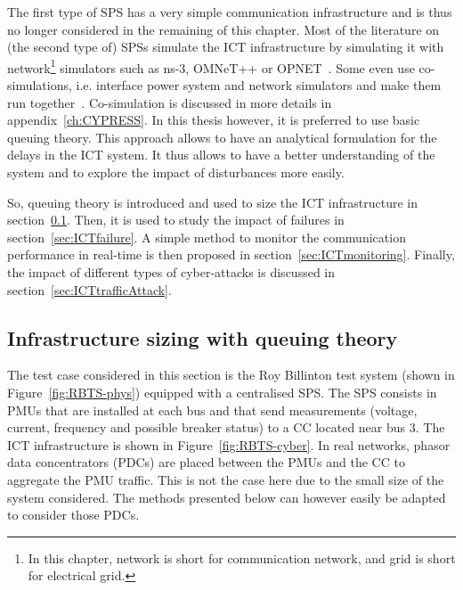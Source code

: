 The first type of SPS has a very simple communication infrastructure and is thus no longer considered in the remaining of this chapter. Most of the literature on (the second type of) SPSs simulate the ICT infrastructure by simulating it with network\footnote{In this chapter, network is short for communication network, and grid is short for electrical grid.} simulators such as ns-3, OMNeT++ or OPNET~\cite{SPS-Ciapessoni}. Some even use co-simulations, i.e. interface power system and network simulators and make them run together~\cite{SPS-MingNi, GECOtestcase}. Co-simulation is discussed in more details in appendix~\ref{ch:CYPRESS}. In this thesis however, it is preferred to use basic queuing theory. This approach allows to have an analytical formulation for the delays in the ICT system. It thus allows to have a better understanding of the system and to explore the impact of disturbances more easily.

So, queuing theory is introduced and used to size the ICT infrastructure in section~\ref{sec:ICTsizing}. Then, it is used to study the impact of failures in section~\ref{sec:ICTfailure}. A simple method to monitor the communication performance in real-time is then proposed in section~\ref{sec:ICTmonitoring}. Finally, the impact of different types of cyber-attacks is discussed in section~\ref{sec:ICTtrafficAttack}.


\subsection{Infrastructure sizing with queuing theory}
\label{sec:ICTsizing}

The test case considered in this section is the Roy Billinton test system (shown in Figure~\ref{fig:RBTS-phys}) equipped with a centralised SPS. The SPS consists in PMUs that are installed at each bus and that send measurements (voltage, current, frequency and possible breaker status) to a CC located near bus 3. The ICT infrastructure is shown in Figure~\ref{fig:RBTS-cyber}. In real networks, phasor data concentrators (PDCs) are placed between the PMUs and the CC to aggregate the PMU traffic. This is not the case here due to the small size of the system considered. The methods presented below can however easily be adapted to consider those PDCs.

